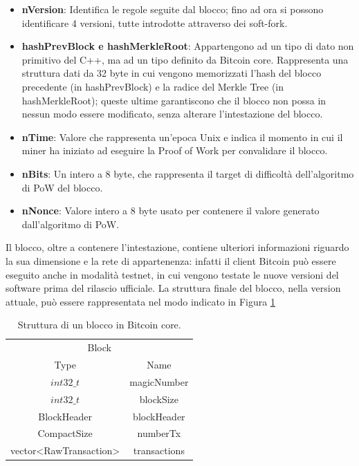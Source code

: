 \begin{itemize}
  \item {\bf nVersion\/}: Identifica le regole seguite dal blocco; fino ad ora si possono identificare 4 versioni, tutte introdotte attraverso dei soft-fork.
  \item {\bf hashPrevBlock e hashMerkleRoot\/}: Appartengono ad un tipo di dato non primitivo del C++, ma ad un tipo definito da Bitcoin core. Rappresenta una struttura dati da 32 byte in cui vengono memorizzati l’hash del blocco precedente (in hashPrevBlock) e la radice del Merkle Tree (in hashMerkleRoot); queste ultime garantiscono che il blocco non possa in nessun modo essere modificato, senza alterare l’intestazione del blocco.
  \item {\bf nTime\/}: Valore che rappresenta un’epoca Unix e indica il momento in cui il miner ha iniziato ad eseguire la Proof of Work per convalidare il blocco.
  \item {\bf nBits\/}: Un intero a 8 byte, che rappresenta il target di difficoltà dell’algoritmo di PoW del blocco.
  \item {\bf nNonce\/}: Valore intero a 8 byte usato per contenere il valore generato dall’algoritmo di PoW.
\end{itemize}

Il blocco, oltre a contenere l’intestazione, contiene ulteriori informazioni riguardo la sua dimensione e la rete di appartenenza: infatti il client Bitcoin può essere eseguito anche in modalità testnet, in cui vengono testate le nuove versioni del software prima del rilascio ufficiale.
La struttura finale del blocco, nella version attuale, può essere rappresentata nel modo indicato in Figura \ref{tab:blockbitcoinc}

\begin{table}
       \centering\small
           \begin{tabular}{cc}
               \toprule
                 \multicolumn{2}{c}{Block} \\
                 \cmidrule(lr){1-2}
                 \multicolumn{1}{c}{Type} & \multicolumn{1}{c}{Name} \\
               \midrule
               $int32\_t$ & magicNumber   \\
               $int32\_t$ & blockSize \\
               BlockHeader & blockHeader \\
               CompactSize & numberTx \\
               vector<RawTransaction> & transactions \\
               \bottomrule
       \end{tabular}
       \caption{Struttura di un blocco in Bitcoin core.\label{tab:blockbitcoinc}}
   \end{table}

